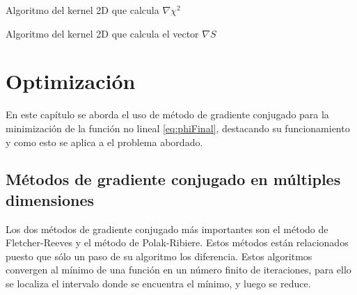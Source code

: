 \begin{algorithm}
	\begin{algorithmic}[1]
		\ENDFOR
	\end{algorithmic}
	\caption{Algoritmo del kernel 2D que calcula $\nabla \chi^{2}$}
	\label{alg:dchi2}
\end{algorithm}

\begin{algorithm}
	\begin{algorithmic}[1]
	\end{algorithmic}
	\caption{Algoritmo del kernel 2D que calcula el vector $\nabla S$}
	\label{alg:dS}
\end{algorithm}

\chapter{Optimización}
\label{cap:opti}

En este capítulo se aborda el uso de método de gradiente conjugado para la minimización de la función no lineal \ref{eq:phiFinal}, destacando su funcionamiento y como esto se aplica a el problema abordado.

\section{Métodos de gradiente conjugado en múltiples dimensiones}

Los dos métodos de gradiente conjugado más importantes son el método de Fletcher-Reeves y el método de Polak-Ribiere. Estos métodos están relacionados puesto que sólo un paso de su algoritmo los diferencia. Estos algoritmos convergen al mínimo de una función en un número finito de iteraciones, para ello se localiza el intervalo donde se encuentra el mínimo, y luego se reduce.

